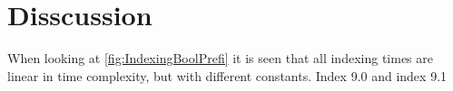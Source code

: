 \section{Disscussion}
When looking at \ref{fig:IndexingBoolPrefi} it is seen that all indexing times are linear in time complexity, but with different constants. Index 9.0 and index 9.1 